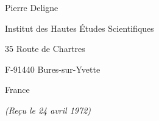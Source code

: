 \documentclass[12pt]{article}
\theoremstyle{remark}
\begin{document}
\vspace{1cm}
\begin{flushright}
Pierre Deligne

Institut des Hautes Études Scientifiques

35 Route de Chartres

F-91440 Bures-sur-Yvette

France

\vspace{0.5cm}
\emph{(Reçu le 24 avril 1972)}
\end{flushright}
\end{document}
